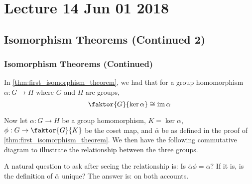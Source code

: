 \chapter{Lecture 14 Jun 01 2018}%
\label{chp:lecture_14_jun_01_2018}

\section{Isomorphism Theorems (Continued 2)}%
\label{sec:isomorphism_theorems_continued_2}

\subsection{Isomorphism Theorems (Continued)}%
\label{sub:isomorphism_theorems_continued}

\begin{note}[Recall]
  In \autoref{thm:first_isomorphism_theorem}, we had that for a group homomorphism $\alpha : G \to H$ where $G$ and $H$ are groups,
  \begin{equation*}
    \faktor{G}{\ker \alpha} \cong \img \alpha
  \end{equation*}

  Now let $\alpha : G \to H$ be a group homomorphism, $K = \ker \alpha$, $\phi : G \to \faktor{G}{K}$ be the coset map, and $\bar{\alpha}$ be as defined in the proof of \autoref{thm:first_isomorphism_theorem}. We then have the following commutative diagram to illustrate the relationship between the three groups.
  \begin{center}
  \end{center}
\end{note}

A natural question to ask after seeing the relationship is: Is $\bar{\alpha} \phi = \alpha$? If it is, is the definition of $\bar{\alpha}$ unique? The answer is:  on both accounts.

